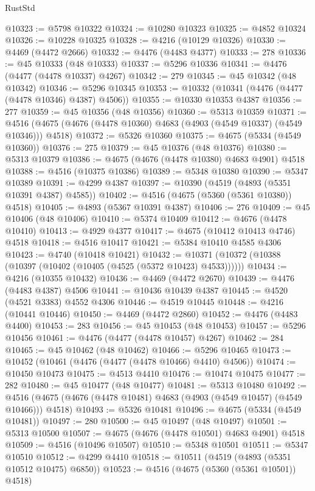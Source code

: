 \begin{lexlean}{RustStd}
\begin{coremodule}
@10323 := @5798 @10322
@10324 := @10280 @10323
@10325 := @4852 @10324
@10326 := @10228 @10325
@10328 := @4216 (@10129 @10326)
@10330 := @4469 (@4472 @2666)
@10332 := @4476 (@4483 @4377)
@10333 := 278
@10336 := @45 @10333 (@48 @10333)
@10337 := @5296 @10336
@10341 := @4476 (@4477 (@4478 @10337) @4267)
@10342 := 279
@10345 := @45 @10342 (@48 @10342)
@10346 := @5296 @10345
@10353 := @10332 (@10341 (@4476 (@4477 (@4478 @10346) @4387) @4506))
@10355 := @10330 @10353 @4387
@10356 := 277
@10359 := @45 @10356 (@48 @10356)
@10360 := @5313 @10359
@10371 := @4516 (@4675 (@4676 (@4478 @10360) @4683 (@4903 (@4549 @10337) (@4549 @10346))) @4518)
@10372 := @5326 @10360
@10375 := @4675 (@5334 (@4549 @10360))
@10376 := 275
@10379 := @45 @10376 (@48 @10376)
@10380 := @5313 @10379
@10386 := @4675 (@4676 (@4478 @10380) @4683 @4901) @4518
@10388 := @4516 (@10375 @10386)
@10389 := @5348 @10380
@10390 := @5347 @10389
@10391 := @4299 @4387
@10397 := @10390 (@4519 (@4893 (@5351 @10391 @4387) @4585))
@10402 := @4516 (@4675 (@5360 (@5361 @10380)) @4518)
@10405 := @4893 (@5367 @10391 @4387)
@10406 := 276
@10409 := @45 @10406 (@48 @10406)
@10410 := @5374 @10409
@10412 := @4676 (@4478 @10410)
@10413 := @4929 @4377
@10417 := @4675 (@10412 @10413 @4746) @4518
@10418 := @4516 @10417
@10421 := @5384 @10410 @4585 @4306
@10423 := @4740 (@10418 @10421)
@10432 := @10371 (@10372 (@10388 (@10397 (@10402 (@10405 (@4525 (@5372 @10423) @4533))))))
@10434 := @4216 (@10355 @10432)
@10436 := @4469 (@4472 @2670)
@10439 := @4476 (@4483 @4387) @4506
@10441 := @10436 @10439 @4387
@10445 := @4520 (@4521 @3383) @4552 @4306
@10446 := @4519 @10445
@10448 := @4216 (@10441 @10446)
@10450 := @4469 (@4472 @2860)
@10452 := @4476 (@4483 @4400)
@10453 := 283
@10456 := @45 @10453 (@48 @10453)
@10457 := @5296 @10456
@10461 := @4476 (@4477 (@4478 @10457) @4267)
@10462 := 284
@10465 := @45 @10462 (@48 @10462)
@10466 := @5296 @10465
@10473 := @10452 (@10461 (@4476 (@4477 (@4478 @10466) @4410) @4506))
@10474 := @10450 @10473
@10475 := @4513 @4410
@10476 := @10474 @10475
@10477 := 282
@10480 := @45 @10477 (@48 @10477)
@10481 := @5313 @10480
@10492 := @4516 (@4675 (@4676 (@4478 @10481) @4683 (@4903 (@4549 @10457) (@4549 @10466))) @4518)
@10493 := @5326 @10481
@10496 := @4675 (@5334 (@4549 @10481))
@10497 := 280
@10500 := @45 @10497 (@48 @10497)
@10501 := @5313 @10500
@10507 := @4675 (@4676 (@4478 @10501) @4683 @4901) @4518
@10509 := @4516 (@10496 @10507)
@10510 := @5348 @10501
@10511 := @5347 @10510
@10512 := @4299 @4410
@10518 := @10511 (@4519 (@4893 (@5351 @10512 @10475) @6850))
@10523 := @4516 (@4675 (@5360 (@5361 @10501)) @4518)

\end{coremodule}
\end{lexlean}
